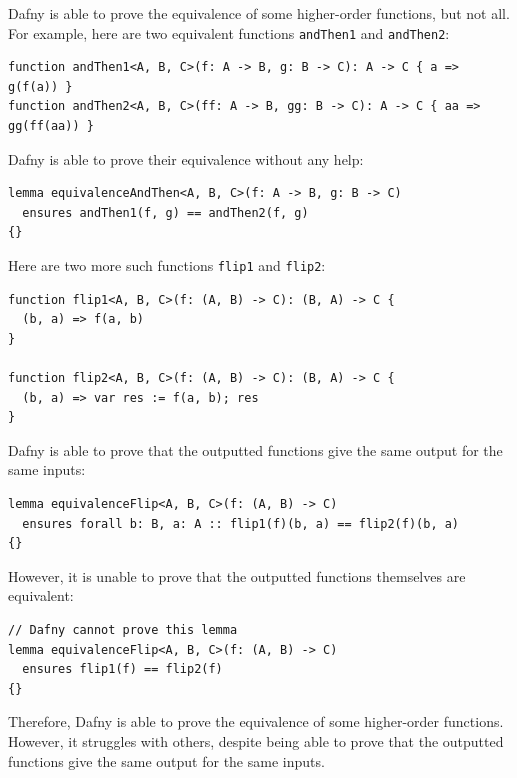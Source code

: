 \documentclass[a4paper, 11pt]{article}
\begin{document}
Dafny is able to prove the equivalence of some higher-order functions, but not all. For example, here are two equivalent functions \lstinline|andThen1| and \lstinline|andThen2|:
\begin{lstlisting}[caption=\lstinline|andThen1| and \lstinline|andThen2| Functions]
function andThen1<A, B, C>(f: A -> B, g: B -> C): A -> C { a => g(f(a)) }
function andThen2<A, B, C>(ff: A -> B, gg: B -> C): A -> C { aa => gg(ff(aa)) }
\end{lstlisting}
%
Dafny is able to prove their equivalence without any help:
\begin{lstlisting}[caption=Equivalence Lemma for \lstinline|andThen1| and \lstinline|andThen2|]
lemma equivalenceAndThen<A, B, C>(f: A -> B, g: B -> C)
  ensures andThen1(f, g) == andThen2(f, g)
{}
\end{lstlisting}
%
Here are two more such functions \lstinline|flip1| and \lstinline|flip2|:
\begin{lstlisting}[caption=\lstinline|flip1| and \lstinline|flip2| Functions]
function flip1<A, B, C>(f: (A, B) -> C): (B, A) -> C {
  (b, a) => f(a, b)
}

function flip2<A, B, C>(f: (A, B) -> C): (B, A) -> C {
  (b, a) => var res := f(a, b); res
}
\end{lstlisting}
%
Dafny is able to prove that the outputted functions give the same output for the same inputs:
\begin{lstlisting}[caption=Equivalence Lemma for \lstinline|flip1| and \lstinline|flip2| with specified arguments]
lemma equivalenceFlip<A, B, C>(f: (A, B) -> C)
  ensures forall b: B, a: A :: flip1(f)(b, a) == flip2(f)(b, a)
{}
\end{lstlisting}
%
However, it is unable to prove that the outputted functions themselves are equivalent:
\begin{lstlisting}[caption=Invalid Equivalence Lemma for \lstinline|flip1| and \lstinline|flip2|]
// Dafny cannot prove this lemma
lemma equivalenceFlip<A, B, C>(f: (A, B) -> C)
  ensures flip1(f) == flip2(f)
{}
\end{lstlisting}
%
Therefore, Dafny is able to prove the equivalence of some higher-order functions. However, it struggles with others, despite being able to prove that the outputted functions give the same output for the same inputs.

\printbibliography
\end{document}
